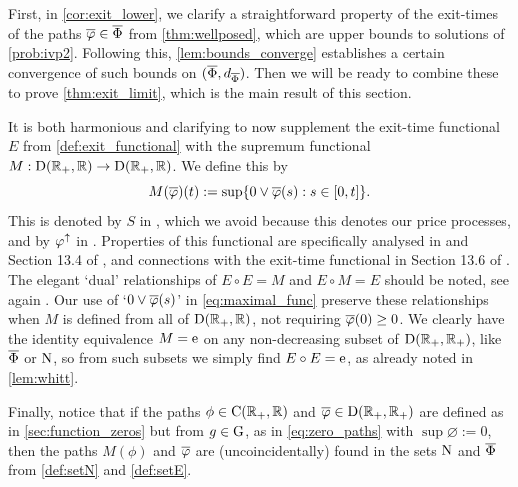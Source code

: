 First, in \autoref{cor:exit_lower}, we clarify a straightforward property of the exit-times of the paths $\overline{\varphi}\in\overline{\Phi}$ from \autoref{thm:wellposed}, which are upper bounds to solutions of \autoref{prob:ivp2}. Following this, \autoref{lem:bounds_converge} establishes a certain convergence of such bounds on $(\overline{\Phi},d_{\overline{\Phi}})$. Then we will be ready to combine these to prove \autoref{thm:exit_limit}, which is the main result of this section.

It is both harmonious and clarifying to now supplement the exit-time functional $E$ from \autoref{def:exit_functional} with the supremum functional $M:\mathrm{D}(\mathbb{R}_+,\mathbb{R})\to\mathrm{D}(\mathbb{R}_+,\mathbb{R})$. We define this by
\begin{equation}\label{eq:maximal_func}
    M(\overline{\varphi})(t) := \sup\{0\vee \overline{\varphi}(s):s\in[0,t]\}.
\end{equation}
This is denoted by $S$ in \cite{whitt_1971}, which we avoid because this denotes our price processes, and by $\varphi^{\uparrow}$ in \cite{whitt_2002}. Properties of this functional are specifically analysed in \cite{whitt_1980} and Section 13.4 of \cite{whitt_2002}, and connections with the exit-time functional in Section 13.6 of \cite{whitt_2002}. The elegant `dual' relationships of $E\circ E=M$ and $E\circ M=E$ should be noted, see again \cite{whitt_1971}. Our use of `$0\vee\overline{\varphi}(s)$' in \autoref{eq:maximal_func} preserve these relationships when $M$ is defined from all of $\mathrm{D}(\mathbb{R}_+,\mathbb{R})$, not requiring $\overline{\varphi}(0)\ge0$. We clearly have the identity equivalence $M=\mathrm{e}$ on any non-decreasing subset of $\mathrm{D}(\mathbb{R}_+,\mathbb{R}_+)$, like $\overline{\Phi}$ or $\mathrm{N}$, so from such subsets we simply find $E\circ E=\mathrm{e}$, as already noted in \autoref{lem:whitt}.

Finally, notice that if the paths $\phi\in\mathrm{C}(\mathbb{R}_+,\mathbb{R})$ and $\overline{\varphi}\in\mathrm{D}(\mathbb{R}_+,\mathbb{R}_+)$ are defined as in \autoref{sec:function_zeros} but from $g\in\mathrm{G}$, as in \autoref{eq:zero_paths} with $\sup\varnothing:=0$, then the paths $M(\phi)$ and $\overline{\varphi}$ are (uncoincidentally) found in the sets $\mathrm{N}$ and $\overline{\Phi}$ from \autoref{def:setN} and \autoref{def:setE}.

